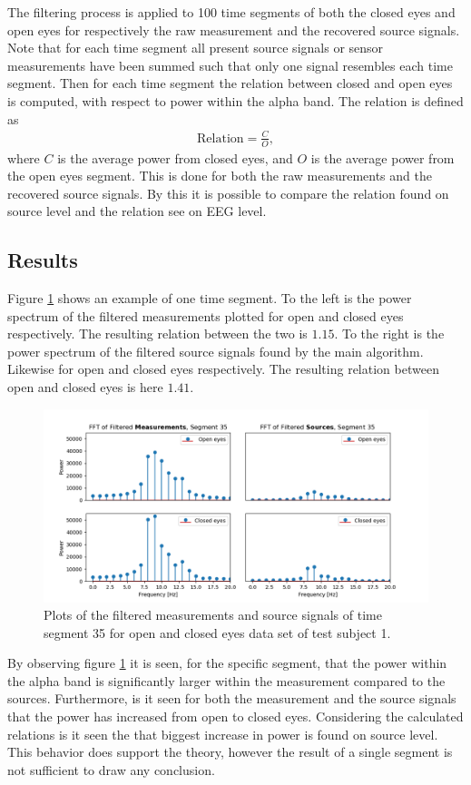 The filtering process is applied to 100 time segments of both the closed eyes and open eyes for respectively the raw measurement and the recovered source signals. 
Note that for each time segment all present source signals or sensor measurements have been summed such that only one signal resembles each time segment.
Then for each time segment the relation between closed and open eyes is computed, with respect to power within the alpha band. 
The relation is defined as 
\begin{align*}
\text{Relation} = \frac{C}{O}, 
\end{align*}
where $C$ is the average power from closed eyes, and $O$ is the average power from the open eyes segment. 
This is done for both the raw measurements and the recovered source signals. 
By this it is possible to compare the relation found on source level and the relation see on EEG level.  

\subsection{Results}
Figure \ref{fig:dft_2} shows an example of one time segment. 
To the left is the power spectrum of the filtered measurements plotted for open and closed eyes respectively. 
The resulting relation between the two is $1.15$. 
To the right is the power spectrum of the filtered source signals found by the main algorithm. 
Likewise for open and closed eyes respectively. 
The resulting relation between open and closed eyes is here $1.41$.  
\begin{figure}[H]
\centering
\includegraphics[scale=0.5]{figures/ch_7/FFT_plot.png}
\caption{Plots of the filtered measurements and source signals of time segment 35 for open and closed eyes data set of test subject 1.}
\label{fig:dft_2}
\end{figure}
\noindent
By observing figure \ref{fig:dft_2} it is seen, for the specific segment, that the power within the alpha band is significantly larger within the measurement compared to the sources. 
Furthermore, is it seen for both the measurement and the source signals that the power has increased from open to closed eyes. 
Considering the calculated relations is it seen the that biggest increase in power is found on source level. 
This behavior does support the theory, however the result of a single segment is not sufficient to draw any conclusion.          

